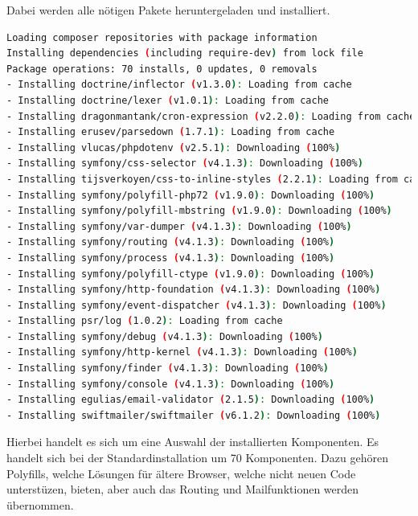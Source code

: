 Dabei werden alle nötigen Pakete heruntergeladen und installiert.
\begin{lstlisting}[language=sh, frame=single]
Loading composer repositories with package information
Installing dependencies (including require-dev) from lock file
Package operations: 70 installs, 0 updates, 0 removals
- Installing doctrine/inflector (v1.3.0): Loading from cache
- Installing doctrine/lexer (v1.0.1): Loading from cache
- Installing dragonmantank/cron-expression (v2.2.0): Loading from cache
- Installing erusev/parsedown (1.7.1): Loading from cache
- Installing vlucas/phpdotenv (v2.5.1): Downloading (100%)
- Installing symfony/css-selector (v4.1.3): Downloading (100%)
- Installing tijsverkoyen/css-to-inline-styles (2.2.1): Loading from cache
- Installing symfony/polyfill-php72 (v1.9.0): Downloading (100%)
- Installing symfony/polyfill-mbstring (v1.9.0): Downloading (100%)
- Installing symfony/var-dumper (v4.1.3): Downloading (100%)
- Installing symfony/routing (v4.1.3): Downloading (100%)
- Installing symfony/process (v4.1.3): Downloading (100%)
- Installing symfony/polyfill-ctype (v1.9.0): Downloading (100%)
- Installing symfony/http-foundation (v4.1.3): Downloading (100%)
- Installing symfony/event-dispatcher (v4.1.3): Downloading (100%)
- Installing psr/log (1.0.2): Loading from cache
- Installing symfony/debug (v4.1.3): Downloading (100%)
- Installing symfony/http-kernel (v4.1.3): Downloading (100%)
- Installing symfony/finder (v4.1.3): Downloading (100%)
- Installing symfony/console (v4.1.3): Downloading (100%)
- Installing egulias/email-validator (2.1.5): Downloading (100%)
- Installing swiftmailer/swiftmailer (v6.1.2): Downloading (100%)
\end{lstlisting}

Hierbei handelt es sich um eine Auswahl der installierten Komponenten. Es handelt sich bei der Standardinstallation um 70 Komponenten. Dazu gehören Polyfills, welche Lösungen für ältere Browser, welche nicht neuen Code unterstüzen, bieten, aber auch das Routing und Mailfunktionen werden übernommen.

